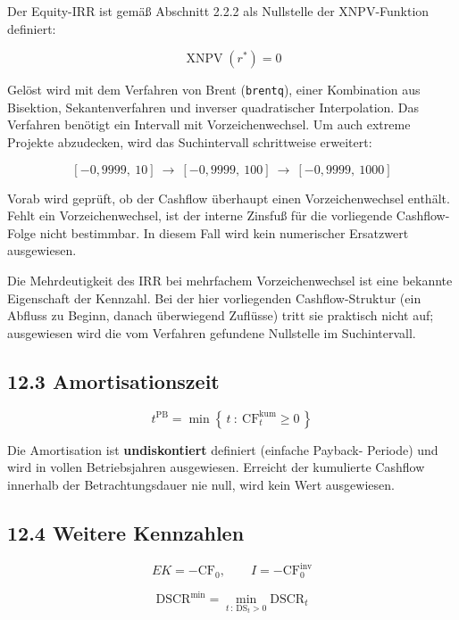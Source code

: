 \documentclass[
  a4paper,
  10pt]{article}
\renewenvironment{quote}
  {\begin{tcolorbox}[
      enhanced,
      breakable,
      colback=Wash,
      colframe=Brand,
      boxrule=0pt,
      leftrule=2.2pt,
      arc=0pt,
      left=8pt,right=8pt,top=6pt,bottom=6pt,
      before skip=8pt,after skip=9pt
    ]\small\color{InkSoft}}
  {\end{tcolorbox}}
\begin{document}
Der Equity-IRR ist gemäß Abschnitt 2.2.2 als Nullstelle der
XNPV-Funktion definiert:

\[ \operatorname{XNPV}(r^{*}) = 0 \]

Gelöst wird mit dem Verfahren von Brent (\texttt{brentq}), einer
Kombination aus Bisektion, Sekantenverfahren und inverser quadratischer
Interpolation. Das Verfahren benötigt ein Intervall mit
Vorzeichenwechsel. Um auch extreme Projekte abzudecken, wird das
Suchintervall schrittweise erweitert:

\[ \left[-0{,}9999,\ 10\right] \ \rightarrow\ \left[-0{,}9999,\ 100\right] \ \rightarrow\ \left[-0{,}9999,\ 1000\right] \]

Vorab wird geprüft, ob der Cashflow überhaupt einen Vorzeichenwechsel
enthält. Fehlt ein Vorzeichenwechsel, ist der interne Zinsfuß für die
vorliegende Cashflow-Folge nicht bestimmbar. In diesem Fall wird kein
numerischer Ersatzwert ausgewiesen.

\begin{quote}
Die Mehrdeutigkeit des IRR bei mehrfachem Vorzeichenwechsel ist eine
bekannte Eigenschaft der Kennzahl. Bei der hier vorliegenden
Cashflow-Struktur (ein Abfluss zu Beginn, danach überwiegend Zuflüsse)
tritt sie praktisch nicht auf; ausgewiesen wird die vom Verfahren
gefundene Nullstelle im Suchintervall.
\end{quote}

\hypertarget{amortisationszeit}{%
\subsection{12.3 Amortisationszeit}\label{amortisationszeit}}

\[ t^{\mathrm{PB}} = \min\left\{\,t \ :\ \mathrm{CF}^{\mathrm{kum}}_t \geq 0\,\right\} \]

Die Amortisation ist \textbf{undiskontiert} definiert (einfache Payback-
Periode) und wird in vollen Betriebsjahren ausgewiesen. Erreicht der
kumulierte Cashflow innerhalb der Betrachtungsdauer nie null, wird kein
Wert ausgewiesen.

\hypertarget{weitere-kennzahlen}{%
\subsection{12.4 Weitere Kennzahlen}\label{weitere-kennzahlen}}

\[ EK = -\mathrm{CF}_0, \qquad I = -\mathrm{CF}^{\mathrm{inv}}_0 \]

\[ \mathrm{DSCR}^{\min} = \min_{t\,:\,\mathrm{DS}_t > 0} \mathrm{DSCR}_t \]
\end{document}
